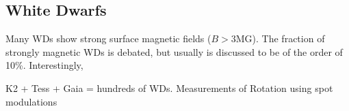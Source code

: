 {\color{red} \subsection{White Dwarfs}}
Many WDs show strong surface magnetic fields ($B>$3MG). The fraction of strongly magnetic WDs is debated, but usually is discussed to be of the order of 10\%. Interestingly,  

K2 + Tess + Gaia = hundreds of WDs. Measurements of Rotation using spot modulations